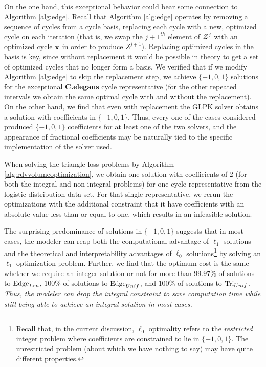  
 On the one hand, this exceptional behavior could bear some connection to Algorithm \ref{alg:edge}.  
 Recall that Algorithm \ref{alg:edge} operates by removing a sequence of cycles from a cycle basis, replacing each cycle with a new, optimized cycle on each iteration (that is, we swap the $j+1^{th}$ element of $Z^{j}$ with an optimized cycle $\mathbf{x}$ in order to produce $Z^{j+1}$). Replacing optimized cycles in the basis is key, since without replacement it would be possible in theory to get a set of optimized cycles that no longer form a basis. We verified that if we modify Algorithm \ref{alg:edge} to skip the replacement step, we achieve $\{-1,0,1\}$ solutions for the exceptional \textbf{C.elegans} cycle representative (for the other repeated intervals we obtain the same optimal cycle with and without the replacement).  
 On the other hand, we find that even with replacement the GLPK solver obtains a solution with coefficients in $\{-1, 0, 1\}$.  Thus, every one of the cases considered produced $\{-1, 0, 1\}$ coefficients for at least one of the two solvers, and the appearance of fractional coefficients may be naturally tied to the specific  implementation of the solver used.


 When solving the triangle-loss problems by Algorithm \ref{alg:rdvvolumeoptimization}, we obtain one solution with coefficients of $2$ (for both the integral and non-integral problems) for one cycle representative from the logistic distribution data set. For that single representative, we rerun the optimizations with the additional constraint that it have coefficients with an absolute value less than or equal to one, which results in an infeasible solution. 

The surprising predominance of solutions in $\{-1, 0, 1\}$ suggests that in most cases, the modeler can reap both the computational advantage of $\ell_1$ solutions and the theoretical and interpretability advantages of $\ell_0$  solutions\footnote{Recall that, in the current discussion, $\ell_0$ optimality refers to the \emph{restricted} integer problem where coefficients are constrained to lie in $\{-1,0,1\}$.  The unrestricted problem (about which we have nothing to say) may have quite different properties.} by solving an $\ell_1$ optimization problem. Further, we find that the optimum cost is the same whether we require an integer solution or not for more than $99.97\%$ of solutions to \pr $\mathrm{Edge}_{Len}$, $100\%$ of solutions to $\mathrm{Edge}_{Unif}$, and $100\%$ of solutions to $\mathrm{Tri}_{Unif}$. \emph{Thus, the modeler can drop the integral constraint to save computation time while still being able to achieve an integral solution in most cases.}  

